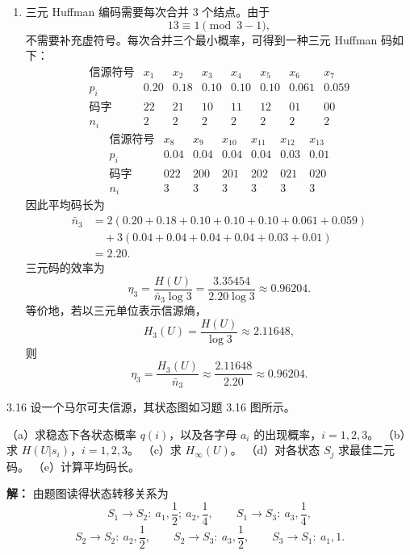 \documentclass[UTF8,11pt,a4paper]{ctexart}
\begin{document}
\begin{enumerate}[label=\textnormal{(\alph*)}]
  \item 三元 Huffman 编码需要每次合并 $3$ 个结点。由于
  \[
  13\equiv 1 \pmod{3-1},
  \]
  不需要补充虚符号。每次合并三个最小概率，可得到一种三元 Huffman 码如下：
  \[
  \begin{array}{c|ccccccc}
  \text{信源符号} & x_1 & x_2 & x_3 & x_4 & x_5 & x_6 & x_7\\ \hline
  p_i & 0.20 & 0.18 & 0.10 & 0.10 & 0.10 & 0.061 & 0.059\\
  \text{码字} & 22 & 21 & 10 & 11 & 12 & 01 & 00\\
  n_i & 2 & 2 & 2 & 2 & 2 & 2 & 2
  \end{array}
  \]
  \[
  \begin{array}{c|cccccc}
  \text{信源符号} & x_8 & x_9 & x_{10} & x_{11} & x_{12} & x_{13}\\ \hline
  p_i & 0.04 & 0.04 & 0.04 & 0.04 & 0.03 & 0.01\\
  \text{码字} & 022 & 200 & 201 & 202 & 021 & 020\\
  n_i & 3 & 3 & 3 & 3 & 3 & 3
  \end{array}
  \]
  因此平均码长为
  \[
  \begin{aligned}
  \bar n_3
  &=2(0.20+0.18+0.10+0.10+0.10+0.061+0.059)\\
  &\quad +3(0.04+0.04+0.04+0.04+0.03+0.01)\\
  &=2.20.
  \end{aligned}
  \]
  三元码的效率为
  \[
  \eta_3=\frac{H(U)}{\bar n_3\log 3}
  =\frac{3.35454}{2.20\log 3}
  \approx 0.96204.
  \]
  等价地，若以三元单位表示信源熵，
  \[
  H_3(U)=\frac{H(U)}{\log 3}\approx 2.11648,
  \]
  则
  \[
  \eta_3=\frac{H_3(U)}{\bar n_3}
  \approx \frac{2.11648}{2.20}\approx 0.96204.
  \]
\end{enumerate}

\vspace{0.8em}

\begin{problem}{3.16}
设一个马尔可夫信源，其状态图如习题 3.16 图所示。

（a）求稳态下各状态概率 \( q(i) \)，以及各字母 \( a_i \) 的出现概率，\( i=1,2,3 \)。
（b）求 \( H(U|s_i) \)，\( i=1,2,3 \)。
（c）求 \( H_\infty(U) \)。
（d）对各状态 \( S_j \) 求最佳二元码。
（e）计算平均码长。
\end{problem}
\noindent\textbf{解：}
由题图读得状态转移关系为
\[
S_1\to S_2:\ a_1,\frac12;\ a_2,\frac14,
\qquad
S_1\to S_3:\ a_3,\frac14,
\]
\[
S_2\to S_2:\ a_2,\frac12,
\qquad
S_2\to S_3:\ a_3,\frac12,
\qquad
S_3\to S_1:\ a_1,1.
\]
\end{document}
